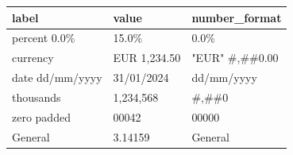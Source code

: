 \documentclass[11pt,a4paper]{article}
\begin{document}
\begin{table}[h]
\begin{tabular}{|l|l|l|}
\hline
label & value & number\_format \\ \hline
percent 0.0\% & 15.0\% & 0.0\% \\ \hline
currency & EUR 1,234.50 & "EUR" \#,\#\#0.00 \\ \hline
date dd/mm/yyyy & 31/01/2024 & dd/mm/yyyy \\ \hline
thousands & 1,234,568 & \#,\#\#0 \\ \hline
zero padded & 00042 & 00000 \\ \hline
General & 3.14159 & General \\ \hline
\end{tabular}
\end{table}
\end{document}
